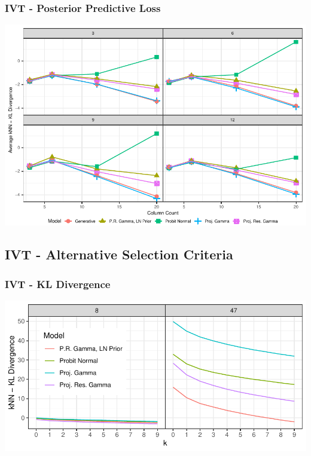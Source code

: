 \documentclass[aspectratio=169]{beamer}
\newlength{\frametextheight}
\begin{document}
\begin{frame}
  \frametitle{IVT - Posterior Predictive Loss}
  \begin{center}
    \includegraphics[height=\frametextheight]{./images/simulation_knn_kld}
  \end{center}
\end{frame}

\subsection*{IVT - Alternative Selection Criteria}

\begin{frame}
  \frametitle{IVT - KL Divergence}
  \begin{center}
    \includegraphics[height=\frametextheight]{./images/knn_kld}
  \end{center}
\end{frame}
\end{document}
